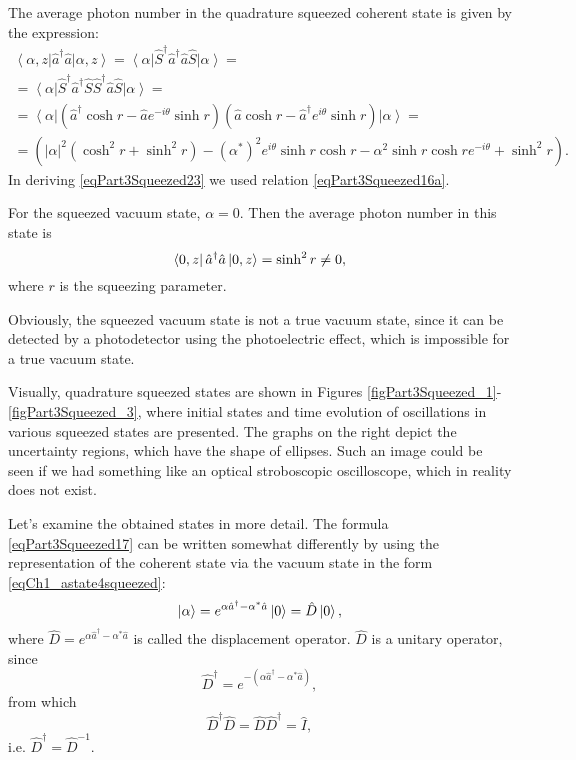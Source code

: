 The average photon number in the quadrature squeezed coherent state
is given by the expression:
\begin{eqnarray}
\left<\alpha, z\right|\hat{a}^{\dag}\hat{a}\left|\alpha, z\right> =
\left<\alpha\right|\hat{S}^{\dag}\hat{a}^{\dag}\hat{a}\hat{S}\left|\alpha\right>
=
\nonumber \\
=
\left<\alpha\right|\hat{S}^{\dag}\hat{a}^{\dag}\hat{S}\hat{S}^{\dag}\hat{a}\hat{S}\left|\alpha\right>
= 
\nonumber \\
=
\left<\alpha\right|
\left(\hat{a}^{\dag} \cosh r - \hat{a}e^{-i\theta}\sinh r \right)
\left(\hat{a} \cosh r - \hat{a}^{\dag} e^{i\theta}\sinh r \right)
\left|\alpha\right> = 
\nonumber \\
=
\left(
\left|\alpha\right|^2\left(\cosh^2 r + \sinh^2 r\right) -
\left(\alpha^{*}\right)^2
e^{i\theta} \sinh r \cosh r - 
\alpha^2 \sinh r \cosh r e^{- i\theta} + \sinh^2 r
\right).
\label{eqPart3Squeezed23}
\end{eqnarray}
In deriving \eqref{eqPart3Squeezed23} we used relation
\eqref{eqPart3Squeezed16a}.

For the squeezed vacuum state, $\alpha = 0$. Then the average
photon number in this state is
\begin{equation}
\bra{0, z}\hat{a}^{\dag}\hat{a}\ket{0, z} =
\sinh^2 r \ne 0,
\label{eqPart3Squeezed24}
\end{equation}
where $r$ is the squeezing parameter.

Obviously, the squeezed vacuum state is not a true
vacuum state, since it can be detected by a photodetector
using the photoelectric effect, which is impossible for a true vacuum state.




%
%

Visually, quadrature squeezed states are shown in Figures
\ref{figPart3Squeezed_1}-\ref{figPart3Squeezed_3}, where initial states and
time evolution of oscillations in various squeezed states are presented.
The graphs on the right depict the uncertainty regions, which have the shape of ellipses.
Such an image could be seen if we had something like an optical
stroboscopic oscilloscope, which in reality does not exist.

Let's examine the obtained states in more detail. The formula
\eqref{eqPart3Squeezed17} can be written somewhat differently by
using the representation of the coherent state via the vacuum state
in the form \eqref{eqCh1_astate4squeezed}:
\begin{equation}
\left|\alpha\right> =  
e^{\alpha \hat{a}^{\dag} - \alpha^{*} \hat{a}}\ket{0} = 
\hat{D}\ket{0},
\nonumber
\end{equation}
where $\hat{D} = e^{\alpha \hat{a}^{\dag} - \alpha^{*} \hat{a}}$ is called
the displacement operator. $\hat{D}$ is a unitary operator, since 
\[
\hat{D}^{\dag} = e^{-\left(\alpha \hat{a}^{\dag} - \alpha^{*} \hat{a}\right)},
\]
from which
\[
\hat{D}^{\dag} \hat{D} = \hat{D} \hat{D}^{\dag} = \hat{I},
\]
i.e. $\hat{D}^{\dag} = \hat{D}^{-1}$.

